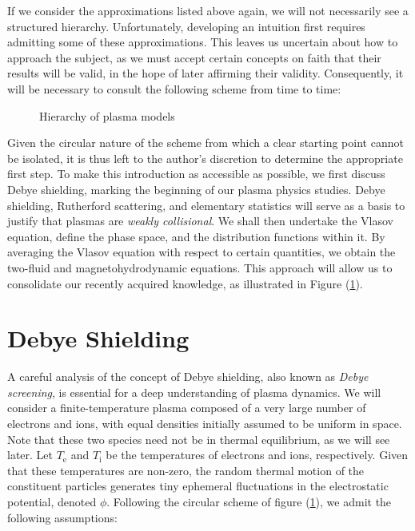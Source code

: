 If we consider the approximations listed above again, we will not necessarily see a structured hierarchy. Unfortunately, developing an intuition first requires admitting some of these approximations. This leaves us uncertain about how to approach the subject, as we must accept certain concepts on faith that their results will be valid, in the hope of later affirming their validity. Consequently, it will be necessary to consult the following scheme from time to time:

\begin{figure}[H]
    \centering
    \scalebox{0.8}{}
    \caption{Hierarchy of plasma models}
    \label{fig1-2}
\end{figure}

Given the circular nature of the scheme from which a clear starting point cannot be isolated, it is thus left to the author's discretion to determine the appropriate first step. To make this introduction as accessible as possible, we first discuss Debye shielding, marking the beginning of our plasma physics studies. Debye shielding, Rutherford scattering, and elementary statistics will serve as a basis to justify that plasmas are \textit{weakly collisional}. We shall then undertake the Vlasov equation, define the phase space, and the distribution functions within it. By averaging the Vlasov equation with respect to certain quantities, we obtain the two-fluid and magnetohydrodynamic equations. This approach will allow us to consolidate our recently acquired knowledge, as illustrated in Figure (\ref{fig1-2}).

\section{Debye Shielding}

A careful analysis of the concept of Debye shielding, also known as \textit{Debye screening}, is essential for a deep understanding of plasma dynamics. We will consider a finite-temperature plasma composed of a very large number of electrons and ions, with equal densities initially assumed to be uniform in space. Note that these two species need not be in thermal equilibrium, as we will see later. Let $T_\text{e}$ and $T_\mathrm{i}$ be the temperatures of electrons and ions, respectively. Given that these temperatures are non-zero, the random thermal motion of the constituent particles generates tiny ephemeral fluctuations in the electrostatic potential, denoted $\phi$. Following the circular scheme of figure (\ref{fig1-2}), we admit the following assumptions:


